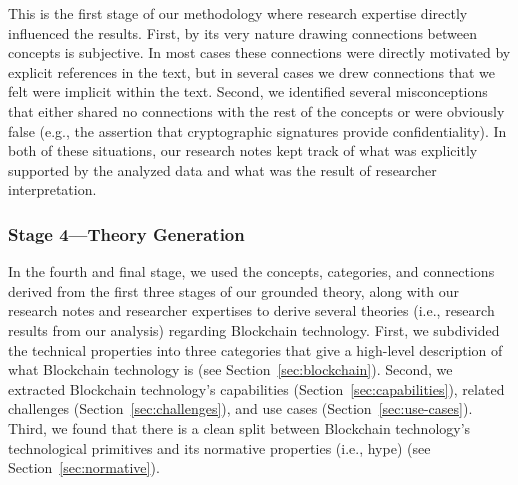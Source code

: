 
This is the first stage of our methodology where research expertise directly influenced the results.
First, by its very nature drawing connections between concepts is subjective.
In most cases these connections were directly motivated by explicit references in the text, but in several cases we drew connections that we felt were implicit within the text.
Second, we identified several misconceptions that either shared no connections with the rest of the concepts or were obviously false (e.g., the assertion that cryptographic signatures provide confidentiality).
In both of these situations, our research notes kept track of what was explicitly supported by the analyzed data and what was the result of researcher interpretation.

\subsubsection{Stage 4---Theory Generation}
In the fourth and final stage, we used the concepts, categories, and connections derived from the first three stages of our grounded theory, along with our research notes and researcher expertises to derive several theories (i.e., research results from our analysis) regarding Blockchain technology.
First, we subdivided the technical properties into three categories that give a high-level description of what Blockchain technology is (see Section~\ref{sec:blockchain}).
Second, we extracted Blockchain technology's capabilities (Section~\ref{sec:capabilities}), related challenges (Section~\ref{sec:challenges}), and use cases (Section~\ref{sec:use-cases}).
Third, we found that there is a clean split between Blockchain technology's technological primitives and its normative properties (i.e., hype) (see Section~\ref{sec:normative}).

